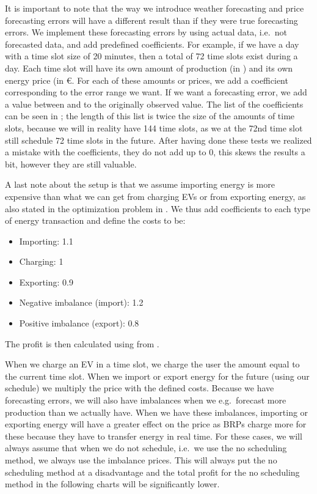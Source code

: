 It is important to note that the way we introduce weather forecasting and price forecasting errors will have a different result than if they were true forecasting errors. We implement these forecasting errors by using actual data, i.e.\ not forecasted data, and add predefined coefficients. For example, if we have a day with a time slot size of 20 minutes, then a total of \num{72} time slots exist during a day. Each time slot will have its own amount of production (in \kwh{}) and its own energy price (in \si{\euro}. For each of these amounts or prices, we add a coefficient corresponding to the error range we want. If we want a  forecasting error, we add a value between  and  to the originally observed value. The list of the coefficients can be seen in ; the length of this list is twice the size of the amounts of time slots, because we will in reality have 144 time slots, as we at the 72nd time slot still schedule 72 time slots in the future. After having done these tests we realized a mistake with the coefficients, they do not add up to 0, this skews the results a bit, however they are still valuable.

A last note about the setup is that we assume importing energy is more expensive than what we can get from charging EVs or from exporting energy, as also stated in the optimization problem in . We thus add coefficients to each type of energy transaction and define the costs to be: 
\begin{itemize}
  \item Importing: \num{1.1}
  \item Charging: \num{1}
  \item Exporting: \num{0.9}
  \item Negative imbalance (import): \num{1.2}
  \item Positive imbalance (export): \num{0.8}
\end{itemize}
The profit is then calculated using  from .

When we charge an EV in a time slot, we charge the user the amount equal to the current time slot. When we import or export energy for the future (using our schedule) we multiply the price with the defined costs. Because we have forecasting errors, we will also have imbalances when we e.g.\ forecast more production than we actually have. When we have these imbalances, importing or exporting energy will have a greater effect on the price as BRPs charge more for these because they have to transfer energy in real time. For these cases, we will always assume that when we do not schedule, i.e.\ we use the no scheduling method, we always use the imbalance prices. This will always put the no scheduling method at a disadvantage and the total profit for the no scheduling method in the following charts will be significantly lower.


